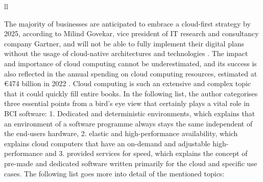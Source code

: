 \begin{table}[!ht]
{\begin{tabular}{ll}
       \\ \hline
    \end{tabular}%
  }
  \vspace{10pt}
  \caption{The three abstraction levels and types of cloud computing \citep{amazon_web_services_inc_what_nodate}.}
  \vspace{-5pt}
  \label{tab:cloud-computing-types}
\end{table}

The majority of businesses are anticipated to embrace a cloud-first strategy by 2025, according to Milind Govekar, vice president of IT research and consultancy company Gartner, and will not be able to fully implement their digital plans without the usage of cloud-native architectures and technologies \citep{gartner_gartner_nodate}. The impact and importance of cloud computing cannot be underestimated, and its success is also reflected in the annual spending on cloud computing resources, estimated at €474 billion in 2022 \citep{gartner_gartner_nodate}. Cloud computing is such an extensive and complex topic that it could quickly fill entire books. In the following list, the author categorises three essential points from a bird's eye view that certainly plays a vital role in BCI software: 1. Dedicated and deterministic environments, which explains that an environment of a software programme always stays the same independent of the end-users hardware, 2. elastic and high-performance availability, which explains cloud computers that have an on-demand and adjustable high-performance and 3. provided services for speed, which explains the concept of pre-made and dedicated software written primarily for the cloud and specific use cases. The following list goes more into detail of the mentioned topics:

